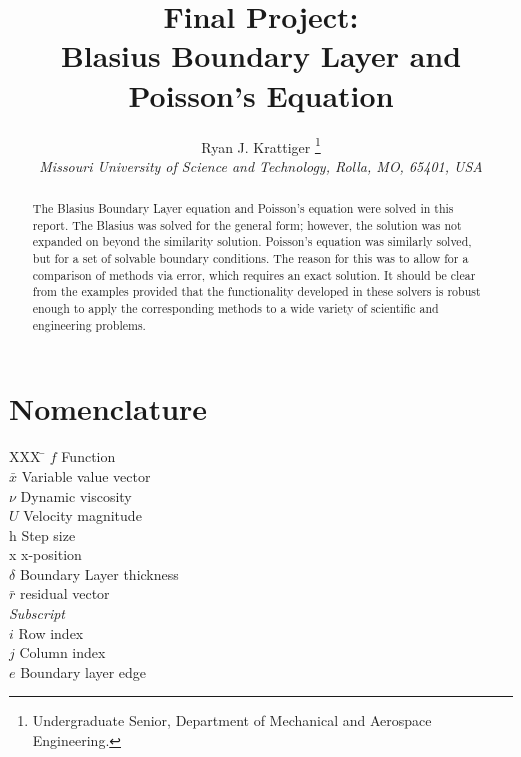 \documentclass[]{aiaa-tc}%
\title{Final Project: \\ Blasius Boundary Layer and Poisson's Equation}
\author{
  Ryan J. Krattiger%
    \thanks{Undergraduate Senior, Department of Mechanical and Aerospace Engineering.} \\
  {\normalsize\itshape
  Missouri University of Science and Technology, Rolla, MO, 65401, USA}
 }
\begin{document}
\maketitle

\begin{abstract}
The Blasius Boundary Layer equation and Poisson's equation were solved
in this report. The Blasius was solved for the general form; however, the solution
was not expanded on beyond the similarity solution. Poisson's equation was similarly
solved, but for a set of solvable boundary conditions. The reason for this was to
allow for a comparison of methods via error, which requires an exact solution.
It should be clear from the examples provided that the functionality developed in
these solvers is robust enough to apply the corresponding methods to a wide variety
of scientific and engineering problems.
\end{abstract}

\newpage

\tableofcontents

\lstlistoflistings

\newpage

\section*{Nomenclature}

\begin{tabbing}
  XXX \= \kill%
  $f$ \> Function \\
  $\bar x$ \> Variable value vector \\
  $\nu$ \> Dynamic viscosity \\
  $U$ \> Velocity magnitude \\
  h \> Step size \\
  x \> x-position \\
  $\delta$ \> Boundary Layer thickness \\
  $\bar r$ \> residual vector \\
  \textit{Subscript} \\
  $i$ \> Row index \\
  $j$ \> Column index \\
  $e$ \> Boundary layer edge \\
 \end{tabbing}
\end{document}

